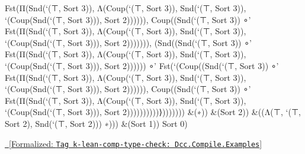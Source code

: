 \documentclass{article}
\newcommand{\leanlink}[2]{
  \hfill \href{#1}{\textcolor{leanblue}\faCheckSquare~[Formalized: \texttt{#2}]}%
}
\begin{document}
\begin{leancode}
Fst(Π(Snd(`(⊤, Sort 3)), Λ(Coup(`(⊤, Sort 3)), Snd(`(⊤, Sort 3)), `(Coup(Snd(`(⊤, Sort 3))),
Sort 2)))))), Coup((Snd(`(⊤, Sort 3)) ∘' Fst(Π(Snd(`(⊤, Sort 3)), Λ(Coup(`(⊤, Sort 3)),
Snd(`(⊤, Sort 3)), `(Coup(Snd(`(⊤, Sort 3))), Sort 2))))))), (Snd((Snd(`(⊤, Sort 3)) ∘'
Fst(Π(Snd(`(⊤, Sort 3)), Λ(Coup(`(⊤, Sort 3)), Snd(`(⊤, Sort 3)), `(Coup(Snd(`(⊤, Sort 3))),
Sort 2)))))) ∘' Fst(`(Coup((Snd(`(⊤, Sort 3)) ∘' Fst(Π(Snd(`(⊤, Sort 3)), Λ(Coup(`(⊤, Sort 3)),
Snd(`(⊤, Sort 3)), `(Coup(Snd(`(⊤, Sort 3))), Sort 2)))))), Coup((Snd(`(⊤, Sort 3)) ∘'
Fst(Π(Snd(`(⊤, Sort 3)), Λ(Coup(`(⊤, Sort 3)), Snd(`(⊤, Sort 3)), `(Coup(Snd(`(⊤, Sort 3))),
Sort 2))))))))))⟩))))))) &(∗)) &(Sort 2)) &((Λ(⊤, `(⊤, Sort 2), Snd(`(⊤, Sort 2))) ∗)))
&(Sort 1)) Sort 0)
\end{leancode}
\leanlink{https://github.com/lexzaiello/DCC/blob/7b316fc3eb8aac4736e30d5e9a58918d5215c334/Dcc/Compile/Examples.lean\#L51}{Tag k-lean-comp-type-check: Dcc.Compile.Examples}


\printbibliography
\end{document}
